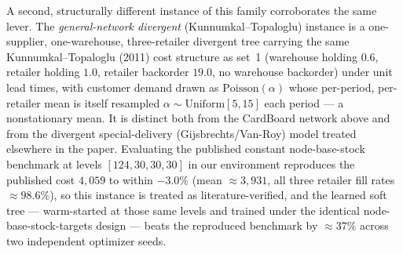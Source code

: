 
A second, structurally different instance of this family corroborates the same lever. The
\emph{general-network divergent} (Kunnumkal--Topaloglu) instance is a one-supplier,
one-warehouse, three-retailer divergent tree carrying the same Kunnumkal--Topaloglu (2011) cost
structure as set~1 (warehouse holding $0.6$, retailer holding $1.0$, retailer backorder $19.0$,
no warehouse backorder) under unit lead times, with customer demand drawn as
$\mathrm{Poisson}(\alpha)$ whose per-period, per-retailer mean is itself resampled
$\alpha\sim\mathrm{Uniform}[5,15]$ each period --- a nonstationary mean. It is distinct both from the
CardBoard network above and from the divergent special-delivery (Gijsbrechts/Van-Roy) model treated
elsewhere in the paper.
Evaluating the published constant node-base-stock benchmark at levels $[124,30,30,30]$ in our
environment reproduces the published cost $4{,}059$ to within $-3.0\%$ (mean $\approx 3{,}931$, all
three retailer fill rates $\approx 98.6\%$), so this instance is treated as literature-verified, and
the learned soft tree --- warm-started at those same levels and trained under the identical
node-base-stock-targets design --- beats the reproduced benchmark by $\approx 37\%$ across two
independent optimizer seeds.

